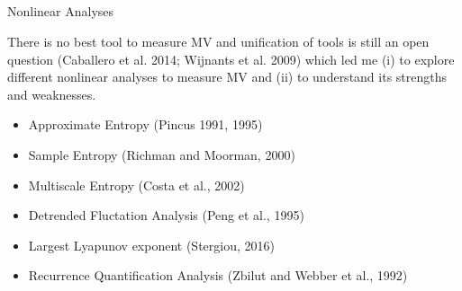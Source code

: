 \subsection{}
{
\begin{frame}{Nonlinear Analyses}


There is no best tool to measure MV and unification of tools is still
an open question (Caballero et al. 2014; Wijnants et al. 2009)
which led me (i) to explore different nonlinear analyses 
to measure MV and (ii) to understand its strengths and weaknesses. 

\begin{itemize}
	\item Approximate Entropy (Pincus 1991, 1995)
	\item Sample Entropy (Richman and Moorman, 2000)
	\item Multiscale Entropy (Costa et al., 2002)
	\item Detrended Fluctation Analysis (Peng et al., 1995)
	\item Largest Lyapunov exponent (Stergiou, 2016)
	\item Recurrence Quantification Analysis (Zbilut and Webber et al., 1992)
\end{itemize}


\end{frame}
}





%
%
%
%
%
%
%
%
%

%



